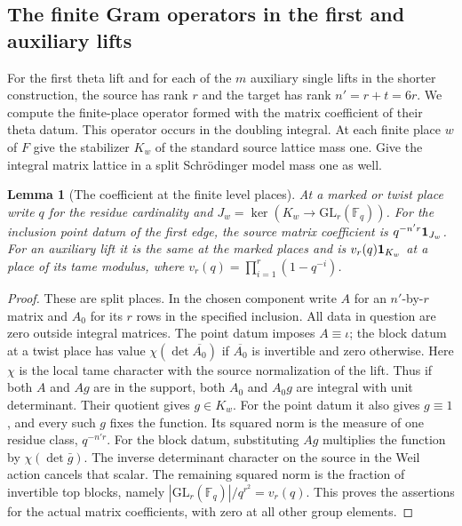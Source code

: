 \documentclass[a4paper,11pt]{article}
\newtheorem{lemma}[proposition]{Lemma}
\theoremstyle{definition}
\theoremstyle{remark}
\numberwithin{equation}{section}
\begin{document}
\subsection{The finite Gram operators in the first and auxiliary lifts}
\label{sec:finitegram709}

For the first theta lift and for each of the \(m\) auxiliary
single lifts in the shorter construction, the source has
rank \(r\) and the target has rank \(n'=r+t=6r\). We compute
the finite-place operator formed with the matrix coefficient
of their theta datum. This operator occurs in the doubling
integral. At each finite place \(w\) of \(F\) give the
stabilizer \(K_w\) of the standard source lattice mass one.
Give the integral matrix lattice in a split Schr\"odinger
model mass one as well.

\begin{lemma}[The coefficient at the finite level places]\leavevmode
\label{lem:sharpplaces709}
At a marked or twist place write \(q\) for the residue
cardinality and \(J_w=\ker(K_w\to\mathrm{GL}_r(\mathbb F_q))\).
For the inclusion point datum of the first edge, the source
matrix coefficient is \(q^{-n'r}{\bf1}_{J_w}\). For an
auxiliary lift it is the same at the marked places and is
\(v_r(q){\bf1}_{K_w}\) at a place of its tame modulus,
where \(v_r(q)=\prod_{i=1}^r(1-q^{-i})\).
\end{lemma}
\begin{proof}
These are split places. In the chosen component write \(A\)
for an \(n'\)-by-\(r\) matrix and \(A_0\) for its \(r\) rows
in the specified inclusion. All data in question are zero
outside integral matrices. The point datum imposes
\(A\equiv\iota\); the block datum at a twist place has
value \(\chi(\det\overline{A_0})\) if \(\overline{A_0}\)
is invertible and zero otherwise. Here \(\chi\) is the local
tame character with the source normalization of the lift.
Thus if both \(A\) and \(Ag\) are in the support, both
\(A_0\) and \(A_0g\) are integral with unit determinant.
Their quotient gives \(g\in K_w\). For the point datum it
also gives \(g\equiv1\), and every such \(g\) fixes the
function. Its squared norm is the measure of one residue
class, \(q^{-n'r}\). For the block datum, substituting
\(Ag\) multiplies the function by \(\chi(\det\bar g)\).
The inverse determinant character on the source in the
Weil action cancels that scalar. The remaining squared
norm is the fraction of invertible top blocks, namely
\(|\mathrm{GL}_r(\mathbb F_q)|/q^{r^2}=v_r(q)\).
This proves the assertions for the actual matrix
coefficients, with zero at all other group elements.
\end{proof}
\end{document}
